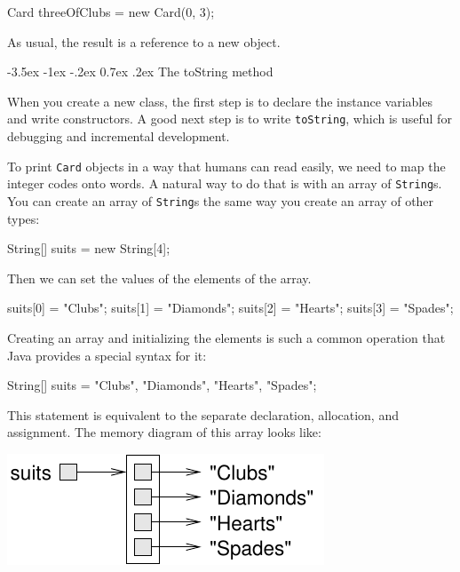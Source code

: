 \documentclass[12pt]{book}
\makeatletter
\theoremstyle{exercise}
\newcommand{\java}[1]{\verb"#1"}
\renewcommand{\section}{\@startsection{section}{1}{\z@}%
    {-3.5ex \@plus -1ex \@minus -.2ex}%
    {0.7ex \@plus.2ex}%
    {\normalfont\Large\bfseries}}
\newcommand{\java}[1]{\lstinline{#1}} %
\makeatother
\begin{document}
\begin{code}
    Card threeOfClubs = new Card(0, 3);
\end{code}

As usual, the result is a reference to a new object.


\section{The toString method}
\label{printcard}


When you create a new class, the first step is to declare the instance variables and write constructors.
A good next step is to write \java{toString}, which is useful for debugging and incremental development.


To print \java{Card} objects in a way that humans can read easily, we need to map the integer codes onto words.
A natural way to do that is with an array of \java{String}s.
You can create an array of \java{String}s the same way you create an array of other types:

\begin{code}
    String[] suits = new String[4];
\end{code}

Then we can set the values of the elements of the array.

\begin{code}
    suits[0] = "Clubs";
    suits[1] = "Diamonds";
    suits[2] = "Hearts";
    suits[3] = "Spades";
\end{code}

Creating an array and initializing the elements is such a common operation that Java provides a special syntax for it:

\begin{code}
    String[] suits = {"Clubs", "Diamonds", "Hearts", "Spades"};
\end{code}


This statement is equivalent to the separate declaration, allocation, and assignment.
The memory diagram of this array looks like:

\begin{center}
\includegraphics{figs/stringarray.pdf}
\end{center}
\end{document}

